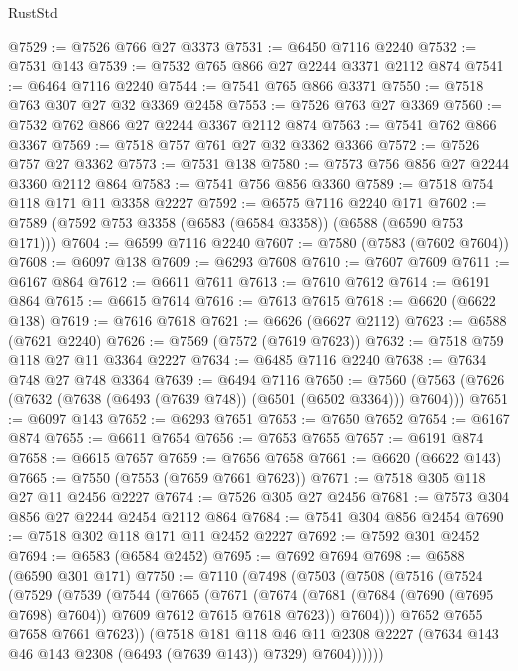 \begin{lexlean}{RustStd}
\begin{coremodule}
@7529 := @7526 @766 @27 @3373
@7531 := @6450 @7116 @2240
@7532 := @7531 @143
@7539 := @7532 @765 @866 @27 @2244 @3371 @2112 @874
@7541 := @6464 @7116 @2240
@7544 := @7541 @765 @866 @3371
@7550 := @7518 @763 @307 @27 @32 @3369 @2458
@7553 := @7526 @763 @27 @3369
@7560 := @7532 @762 @866 @27 @2244 @3367 @2112 @874
@7563 := @7541 @762 @866 @3367
@7569 := @7518 @757 @761 @27 @32 @3362 @3366
@7572 := @7526 @757 @27 @3362
@7573 := @7531 @138
@7580 := @7573 @756 @856 @27 @2244 @3360 @2112 @864
@7583 := @7541 @756 @856 @3360
@7589 := @7518 @754 @118 @171 @11 @3358 @2227
@7592 := @6575 @7116 @2240 @171
@7602 := @7589 (@7592 @753 @3358 (@6583 (@6584 @3358)) (@6588 (@6590 @753 @171)))
@7604 := @6599 @7116 @2240
@7607 := @7580 (@7583 (@7602 @7604))
@7608 := @6097 @138
@7609 := @6293 @7608
@7610 := @7607 @7609
@7611 := @6167 @864
@7612 := @6611 @7611
@7613 := @7610 @7612
@7614 := @6191 @864
@7615 := @6615 @7614
@7616 := @7613 @7615
@7618 := @6620 (@6622 @138)
@7619 := @7616 @7618
@7621 := @6626 (@6627 @2112)
@7623 := @6588 (@7621 @2240)
@7626 := @7569 (@7572 (@7619 @7623))
@7632 := @7518 @759 @118 @27 @11 @3364 @2227
@7634 := @6485 @7116 @2240
@7638 := @7634 @748 @27 @748 @3364
@7639 := @6494 @7116
@7650 := @7560 (@7563 (@7626 (@7632 (@7638 (@6493 (@7639 @748)) (@6501 (@6502 @3364))) @7604)))
@7651 := @6097 @143
@7652 := @6293 @7651
@7653 := @7650 @7652
@7654 := @6167 @874
@7655 := @6611 @7654
@7656 := @7653 @7655
@7657 := @6191 @874
@7658 := @6615 @7657
@7659 := @7656 @7658
@7661 := @6620 (@6622 @143)
@7665 := @7550 (@7553 (@7659 @7661 @7623))
@7671 := @7518 @305 @118 @27 @11 @2456 @2227
@7674 := @7526 @305 @27 @2456
@7681 := @7573 @304 @856 @27 @2244 @2454 @2112 @864
@7684 := @7541 @304 @856 @2454
@7690 := @7518 @302 @118 @171 @11 @2452 @2227
@7692 := @7592 @301 @2452
@7694 := @6583 (@6584 @2452)
@7695 := @7692 @7694
@7698 := @6588 (@6590 @301 @171)
@7750 := @7110
    (@7498
      (@7503
        (@7508
          (@7516
            (@7524
              (@7529
                (@7539
                  (@7544
                    (@7665
                      (@7671
                        (@7674
                          (@7681 (@7684 (@7690 (@7695 @7698) @7604)) @7609 @7612 @7615 @7618 @7623))
                        @7604)))
                  @7652
                  @7655
                  @7658
                  @7661
                  @7623))
              (@7518
                @181
                @118
                @46
                @11
                @2308
                @2227
                (@7634 @143 @46 @143 @2308 (@6493 (@7639 @143)) @7329)
                @7604))))))

\end{coremodule}
\end{lexlean}
